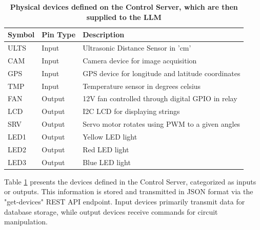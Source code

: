 \documentclass{ieeeaccess}
\begin{document}
\begin{table}
    \caption{\textbf{Physical devices defined on the Control Server, which are then supplied to the LLM}}
    \label{table1}
    \setlength{\tabcolsep}{3pt}
    \begin{tabular}{|p{30pt}|p{32pt}|p{165pt}|}
        \hline
        \textbf{Symbol} &
        \textbf{Pin Type}   &
        \textbf{Description}                                             \\
        \hline
        ULTS   &
        Input  &
        Ultrasonic Distance Sensor in 'cm'                      \\
        \hline
        CAM    &
        Input  &
        Camera device for image acquisition                       \\
        \hline
        GPS    &
        Input  &
        GPS device for longitude and latitude coordinates       \\
        \hline
        TMP    &
        Input  &
        Temperature sensor in degrees celsius    \\
        \hline
        FAN    &
        Output &
        12V fan controlled through digital GPIO in relay \\
        \hline
        LCD    &
        Output &
        I2C LCD for displaying strings                          \\
        \hline
        SRV    &
        Output &
        Servo motor rotates using PWM to a given angles         \\
        \hline
        LED1   &
        Output &
        Yellow LED light                                        \\
        \hline
        LED2   &
        Output &
        Red LED light                                           \\
        \hline
        LED3   &
        Output &
        Blue LED light                                          \\
        \hline
    \end{tabular}
\end{table}

Table \ref{table1} presents the devices defined in the Control Server, categorized as inputs or outputs. This information is stored and transmitted in JSON format via the "get-devices" REST API endpoint. Input devices primarily transmit data for database storage, while output devices receive commands for circuit manipulation.
\end{document}
